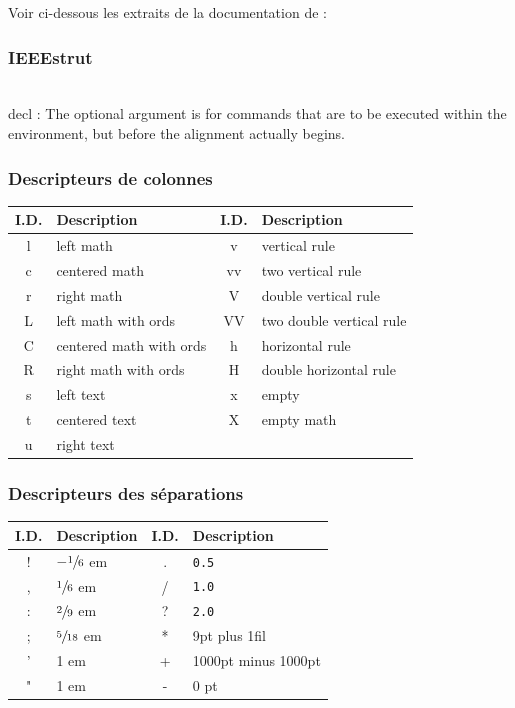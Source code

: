 Voir ci-dessous les extraits de la documentation de  :


\subsubsection{IEEEstrut}

\inlatex{\IEEEstrut[height][depth][decl]} \\
decl : The optional argument is for commands that are to be executed within the environment, but before the alignment actually begins.


\subsubsection{Descripteurs de colonnes}

\setlength\extrarowheight{3pt}
\begin{tabular}{|c|l||c|l|}
	\hline
	I.D. & Description & I.D. & Description \tabularnewline
	\hline
	l & left math & v & vertical rule \tabularnewline
	c & centered math & vv & two vertical rule \tabularnewline
	r & right math & V & double vertical rule \tabularnewline
	L & left math with ords & VV & two double vertical rule \tabularnewline
	C & centered math with ords & h & horizontal rule\tabularnewline
	R & right math with ords & H & double horizontal rule\tabularnewline
	s & left text & x & empty \tabularnewline
	t & centered text & X & empty math \tabularnewline
	u & right text & & \tabularnewline
	\hline
\end{tabular}


\subsubsection{Descripteurs des séparations}

\begin{tabular}{|c|l||c|l|}
	\hline
	I.D. & Description & I.D. & Description \tabularnewline
	\hline
	! & $-\sfrac{1}{6}$ em & . & \texttt{0.5\arraycolsep} \tabularnewline
	, & $\sfrac{1}{6}$ em  & / & \texttt{1.0\arraycolsep} \tabularnewline
	: & $\sfrac{2}{9}$ em  & ? & \texttt{2.0\arraycolsep} \tabularnewline
	; & $\sfrac{5}{18}$ em  & * & 9pt plus 1fil\tabularnewline
	' & 1 em & + & 1000pt minus 1000pt\tabularnewline
	" & 1 em & - & 0 pt\tabularnewline
	\hline
\end{tabular}


